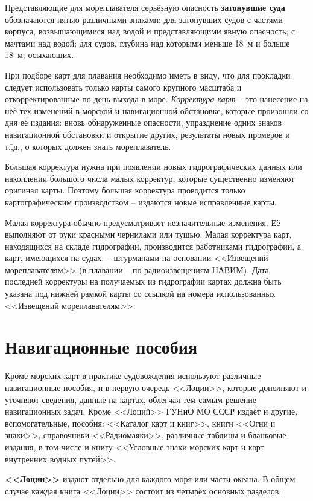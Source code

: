 Представляющие для мореплавателя серьёзную опасность
\textbf{затонувшие суда} обозначаются пятью различными знаками: для
затонувших судов с частями корпуса, возвышающимися над водой и
представляющими явную опасность; с мачтами над водой; для судов,
глубина над которыми меньше 18~м и больше 18~м; осыхающих.

При подборе карт для плавания необходимо иметь в виду, что для
прокладки следует использовать только карты самого крупного масштаба и
откорректированные по день выхода в море. \textit{Корректура
  карт} \--- это нанесение на неё тех
изменений в морской и навигационной обстановке, которые произошли со
дня её издания: вновь обнаруженные опасности, упразднение одних знаков
навигационной обстановки и открытие других, результаты новых промеров
и т.\=,д., о которых должен знать мореплаватель.

Большая корректура нужна при появлении новых гидрографических данных
или накоплении большого числа малых корректур, которые существенно
изменяют оригинал карты. Поэтому большая корректура проводится только
картографическим производством \--- издаются новые исправленные карты.

Малая корректура обычно предусматривает незначительные изменения. Её
выполняют от руки красными чернилами или тушью. Малая корректура карт,
находящихся на складе гидрографии, производится работниками
гидрографии, а карт, имеющихся на судах, \--- штурманами на основании
<<Извещений мореплавателям>> (в плавании \--- по радиоизвещениям
НАВИМ). Дата последней корректуры на получаемых из гидрографии картах
должна быть указана под нижней рамкой карты со ссылкой на номера
использованных <<Извещений мореплавателям>>.

\section{Навигационные пособия}

Кроме морских карт в практике судовождения используют различные
навигационные пособия, и в первую очередь <<Лоции>>, которые дополняют
и уточняют сведения, данные на картах, облегчая тем самым решение
навигационных задач. Кроме <<Лоций>> ГУНиО МО СССР издаёт и другие,
вспомогательные, пособия: <<Каталог карт и книг>>, книги <<Огни и
знаки>>, справочники <<Радиомаяки>>, различные таблицы и бланковые
издания, в том числе и книгу <<Условные знаки морских карт и карт
внутренних водных путей>>.

\textbf{<<Лоции>>} издают отдельно для каждого моря или части
океана. В общем случае каждая книга <<Лоции>> состоит из четырёх
основных разделов:

